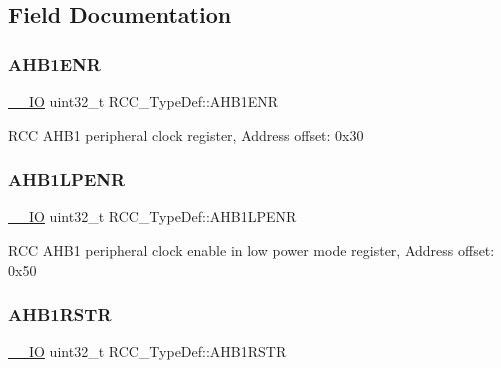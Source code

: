 \subsection{Field Documentation}
\mbox{\label{struct_r_c_c___type_def_af58a7ad868f07f8759eac3e31b6fa79e}} 
\subsubsection{\texorpdfstring{A\+H\+B1\+E\+NR}{AHB1ENR}}
{\footnotesize\ttfamily \hyperlink{core__sc300_8h_aec43007d9998a0a0e01faede4133d6be}{\+\_\+\+\_\+\+IO} uint32\+\_\+t R\+C\+C\+\_\+\+Type\+Def\+::\+A\+H\+B1\+E\+NR}

R\+CC A\+H\+B1 peripheral clock register, Address offset\+: 0x30 \mbox{\label{struct_r_c_c___type_def_a89d6c21f02196b7f59bcc30c1061dd87}} 
\subsubsection{\texorpdfstring{A\+H\+B1\+L\+P\+E\+NR}{AHB1LPENR}}
{\footnotesize\ttfamily \hyperlink{core__sc300_8h_aec43007d9998a0a0e01faede4133d6be}{\+\_\+\+\_\+\+IO} uint32\+\_\+t R\+C\+C\+\_\+\+Type\+Def\+::\+A\+H\+B1\+L\+P\+E\+NR}

R\+CC A\+H\+B1 peripheral clock enable in low power mode register, Address offset\+: 0x50 \mbox{\label{struct_r_c_c___type_def_ad6abf71a348744aa3f2b7e8b214c1ca4}} 
\subsubsection{\texorpdfstring{A\+H\+B1\+R\+S\+TR}{AHB1RSTR}}
{\footnotesize\ttfamily \hyperlink{core__sc300_8h_aec43007d9998a0a0e01faede4133d6be}{\+\_\+\+\_\+\+IO} uint32\+\_\+t R\+C\+C\+\_\+\+Type\+Def\+::\+A\+H\+B1\+R\+S\+TR}

